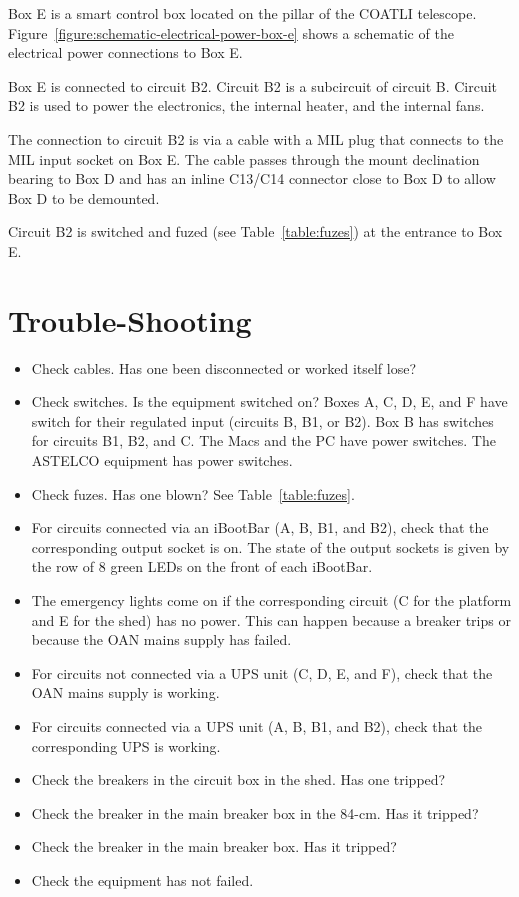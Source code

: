 Box E is a smart control box located on the pillar of the COATLI telescope. Figure~\ref{figure:schematic-electrical-power-box-e} shows a schematic of the electrical power connections to Box E.

Box E is connected to circuit B2. Circuit B2 is a subcircuit of circuit B. Circuit B2 is used to power the electronics, the internal heater, and the internal fans.

The connection to circuit B2 is via a cable with a MIL plug that connects to the MIL input socket on Box E. The cable passes through the mount declination bearing to Box D and has an inline C13/C14 connector close to Box D to allow Box D to be demounted.

Circuit B2 is switched and fuzed (see Table~\ref{table:fuzes}) at the entrance to Box E.

\fi

\section{Trouble-Shooting}

\begin{itemize}
\item Check cables. Has one been disconnected or worked itself lose?
\item Check switches. Is the equipment switched on? Boxes A, C, D, E, and F have switch for their regulated input (circuits B, B1, or B2). Box B has switches for circuits B1, B2, and C. The Macs and the PC have power switches. The ASTELCO equipment has power switches.
\item Check fuzes. Has one blown? See Table~\ref{table:fuzes}.
\item For circuits connected via an iBootBar (A, B, B1, and B2), check that the corresponding output socket is on. The state of the output sockets is given by the row of 8 green LEDs on the front of each iBootBar.
\item The emergency lights come on if the corresponding circuit (C for the platform and E for the shed) has no power. This can happen because a breaker trips or because the OAN mains supply has failed.
\item For circuits not connected via a UPS unit (C, D, E, and F), check that the OAN mains supply is working.
\item For circuits connected via a UPS unit (A, B, B1, and B2), check that the corresponding UPS is working.
\item Check the breakers in the circuit box in the shed. Has one tripped?
\ifcoatlioan
\item Check the breaker in the main breaker box in the 84-cm. Has it tripped?
\fi
\ifddotioan
\item Check the breaker in the main breaker box. Has it tripped?
\fi
\item Check the equipment has not failed.
\end{itemize}

